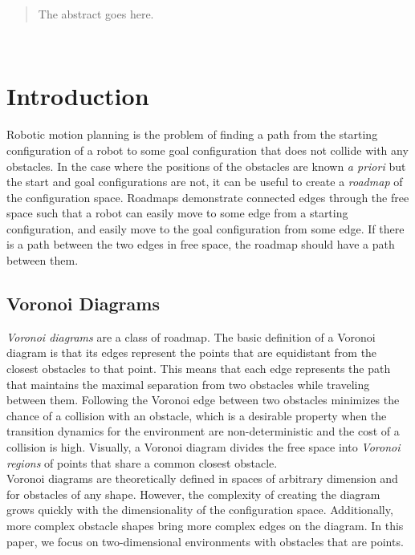 \documentclass[conference]{IEEEtran}
\begin{document}
\maketitle

\begin{abstract}
The abstract goes here.
\end{abstract}





%
\IEEEpeerreviewmaketitle\



\section{Introduction}
Robotic motion planning is the problem of finding a path from the starting
configuration of a robot to some goal configuration that does not collide
with any obstacles. In the case where the positions of the obstacles are
known \emph{a priori} but the start and goal configurations are not, it
can be useful to create a \emph{roadmap} of the configuration space.
Roadmaps demonstrate connected edges through the free space such that a
robot can easily move to some edge from a starting configuration, and
easily move to the goal configuration from some edge. If there is a path
between the two edges in free space, the roadmap should have a path between
them.

\subsection{Voronoi Diagrams}
\emph{Voronoi diagrams} are a class of roadmap. The basic definition
of a Voronoi diagram is that its edges represent the points that are
equidistant from the closest obstacles to that point. This means that each
edge represents the path that maintains the maximal separation from two
obstacles while traveling between them. Following the Voronoi edge between two
obstacles minimizes the chance of a collision with an obstacle, which is
a desirable property when the transition dynamics for the environment are
non-deterministic and the cost of a collision is high. Visually, a Voronoi diagram divides
the free space into \emph{Voronoi regions} of points that share a common closest obstacle.\\
\indent Voronoi diagrams are theoretically defined in spaces of arbitrary dimension
and for obstacles of any shape. However, the complexity of creating the
diagram grows quickly with the dimensionality of the configuration space.
Additionally, more complex obstacle shapes bring more complex edges on the diagram.
In this paper, we focus on two-dimensional environments with obstacles that
are points.
\end{document}
